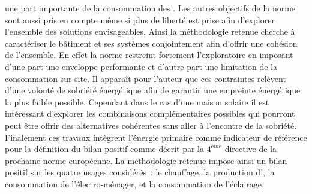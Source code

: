 une part importante de la consommation des .
Les autres objectifs de la norme  sont aussi pris en compte
même si plus de liberté est prise afin d’explorer l’ensemble des solutions envisageables.
Ainsi la méthodologie retenue cherche à caractériser le bâtiment et ses systèmes conjointement
afin d’offrir une cohésion de l’ensemble. En effet la norme restreint fortement l’exploratoire
en imposant d’une part une enveloppe performante et d’autre part une limitation de la
consommation sur site. Il apparaît pour l’auteur que ces contraintes relèvent
d’une volonté de sobriété énergétique afin de garantir une empreinte énergétique
la plus faible possible. Cependant dans le cas d’une maison solaire il est intéressant
d’explorer les combinaisons complémentaires possibles qui pourront peut être offrir des alternatives
cohérentes sans aller à l’encontre de la sobriété.
Finalement ces travaux intègrent l’énergie primaire comme indicateur de référence
pour la définition du bilan positif comme décrit par la $4^{ème}$ directive de la
prochaine norme européenne. La méthodologie retenue impose ainsi un bilan positif
sur les quatre usages considérés~: le chauffage, la production d’, la
consommation de l’électro-ménager, et la consommation de l’éclairage.

